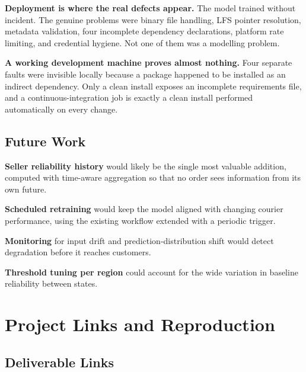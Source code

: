 \documentclass[11pt,a4paper]{report}
\begin{document}
\textbf{Deployment is where the real defects appear.} The model trained without
incident. The genuine problems were binary file handling, LFS pointer
resolution, metadata validation, four incomplete dependency declarations,
platform rate limiting, and credential hygiene. Not one of them was a modelling
problem.

\textbf{A working development machine proves almost nothing.} Four separate
faults were invisible locally because a package happened to be installed as an
indirect dependency. Only a clean install exposes an incomplete requirements
file, and a continuous-integration job is exactly a clean install performed
automatically on every change.

\section{Future Work}

\textbf{Seller reliability history} would likely be the single most valuable
addition, computed with time-aware aggregation so that no order sees information
from its own future.

\textbf{Scheduled retraining} would keep the model aligned with changing courier
performance, using the existing workflow extended with a periodic trigger.

\textbf{Monitoring} for input drift and prediction-distribution shift would
detect degradation before it reaches customers.

\textbf{Threshold tuning per region} could account for the wide variation in
baseline reliability between states.

\appendix
\chapter{Project Links and Reproduction}

\section{Deliverable Links}
\end{document}
